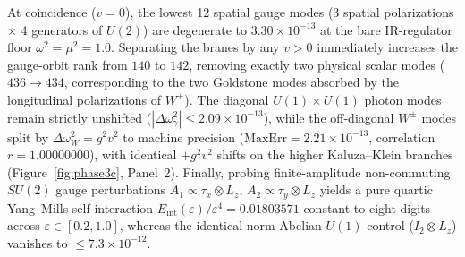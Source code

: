 \documentclass[11pt,a4paper]{article}
\begin{document}
\begin{table}[H]
  \centering
  \caption{Phase~3C exact Coulomb-branch fluctuation spectrum for $U(2)\to U(1)\times U(1)$ brane separation on stacked fuzzy spheres ($N=12=2\times 6$, $g=0.25, \mu=1.0, \nu=3.0$, archival run \texttt{v101\_phase3c\_gauge\_N12}). The bare baseline $\omega_\gamma^2 = \mu^2 = 1.0$ reflects the harmonic IR regulator in Eq.~\eqref{eq:Hmqm}.}
  \label{tab:phase3c}
  \small
  \setlength{\tabcolsep}{5pt}
\end{table}

At coincidence ($v=0$), the lowest 12 spatial gauge modes (3 spatial polarizations $\times$ 4 generators of $U(2)$) are degenerate to $3.30\times 10^{-13}$ at the bare IR-regulator floor $\omega^2 = \mu^2 = 1.0$. Separating the branes by any $v > 0$ immediately increases the gauge-orbit rank from $140$ to $142$, removing exactly two physical scalar modes ($436 \to 434$, corresponding to the two Goldstone modes absorbed by the longitudinal polarizations of $W^\pm$). The diagonal $U(1)\times U(1)$ photon modes remain strictly unshifted ($|\Delta\omega_\gamma^2| \le 2.09\times 10^{-13}$), while the off-diagonal $W^\pm$ modes split by $\Delta\omega_W^2 = g^2 v^2$ to machine precision ($\mathrm{MaxErr} = 2.21\times 10^{-13}$, correlation $r = 1.00000000$), with identical $+g^2 v^2$ shifts on the higher Kaluza--Klein branches (Figure~\ref{fig:phase3c}, Panel~2). Finally, probing finite-amplitude non-commuting $SU(2)$ gauge perturbations $A_1 \propto \tau_x\otimes L_z$, $A_2 \propto \tau_y\otimes L_z$ yields a pure quartic Yang--Mills self-interaction $E_{\mathrm{int}}(\varepsilon)/\varepsilon^4 = 0.01803571$ constant to eight digits across $\varepsilon \in [0.2, 1.0]$, whereas the identical-norm Abelian $U(1)$ control ($I_2 \otimes L_z$) vanishes to $\le 7.3\times 10^{-12}$.
\end{document}
